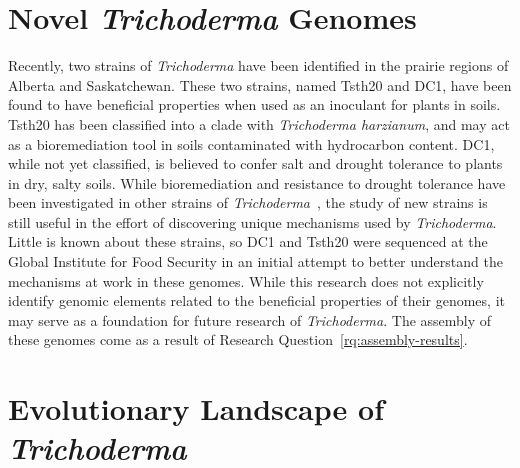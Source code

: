 \section{Novel \textit{Trichoderma} Genomes}\label{lit:novel-genomes}

Recently, two strains of \textit{Trichoderma}
have been identified in the prairie regions of Alberta and
Saskatchewan. These two strains, named Tsth20 and DC1, have been found
to have beneficial properties when used as an inoculant for plants in soils. Tsth20 has been classified into a clade with \textit{Trichoderma harzianum}, and may act as a bioremediation tool in soils contaminated with hydrocarbon content. DC1, while not yet classified, is believed to confer salt and drought tolerance to plants in dry, salty soils. While bioremediation and resistance to drought tolerance have been investigated in other strains of
\textit{Trichoderma}~\cite{senizza2023}, the study of new strains is still useful in the effort of discovering unique mechanisms used by \textit{Trichoderma}. Little is known about these strains, so DC1 and Tsth20 were sequenced at the Global Institute for Food Security in an initial attempt to better understand the mechanisms at work in these genomes. While this research does not explicitly identify genomic elements related to the beneficial properties of their genomes, it may serve as a foundation for future research of \textit{Trichoderma}. The assembly of these genomes come as a result of Research Question~\ref{rq:assembly-results}.

\section{Evolutionary Landscape of \textit{Trichoderma}}\label{lit:evolution}

